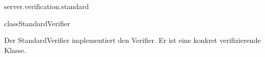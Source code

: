 \begin{texdocpackage}{server.verification.standard}
\label{texdoclet:edu.kit.informatik.studyplan.server.verification.standard}

\begin{texdocclass}{class}{StandardVerifier}
\label{texdoclet:edu.kit.informatik.studyplan.server.verification.standard.StandardVerifier}
\begin{texdocclassintro}
Der StandardVerifier implementiert den Verifier. 
 Er ist eine konkret verifizierende Klasse.\end{texdocclassintro}
\begin{texdocclassconstructors}
\end{texdocclassconstructors}
\begin{texdocclassmethods}
\end{texdocclassmethods}
\end{texdocclass}


\end{texdocpackage}



